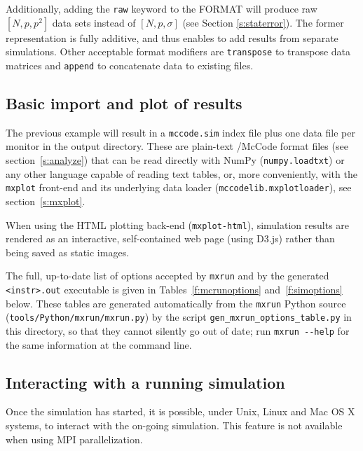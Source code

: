 Additionally, adding the \texttt{raw} keyword to the FORMAT will produce raw
$[N, p, p^2]$ data sets instead of $[N, p, \sigma]$ (see Section
\ref{s:staterror}). The former representation is fully additive, and thus
enables to add results from separate simulations. Other acceptable format
modifiers are \verb+transpose+ to transpose data matrices and \verb+append+ to
concatenate data to existing files.

\subsection{Basic import and plot of results}
\label{s:run-format}
The previous example will result in a \verb+mccode.sim+ index file plus one
data file per monitor in the output directory. These are plain-text
\MCX/McCode format files (see section~\ref{s:analyze}) that can be read
directly with NumPy (\texttt{numpy.loadtxt}) or any other language capable
of reading text tables, or, more conveniently, with the \verb+mxplot+
front-end and its underlying data loader
(\texttt{mccodelib.mxplotloader}), see section~\ref{s:mxplot}.

When using the HTML plotting back-end (\texttt{mxplot-html}), simulation
results are rendered as an interactive, self-contained web page (using D3.js)
rather than being saved as static images.

The full, up-to-date list of options accepted by \texttt{mxrun} and by the
generated \texttt{<instr>.out} executable is given in
Tables~\ref{f:mcrunoptions} and~\ref{f:simoptions} below. These tables are
generated automatically from the \texttt{mxrun} Python source
(\texttt{tools/Python/mxrun/mxrun.py}) by the script
\texttt{gen\_mxrun\_options\_table.py} in this directory, so that they cannot
silently go out of date; run \verb+mxrun --help+ for the same information
at the command line.



\subsection{Interacting with a running simulation}

Once the simulation has started, it is possible, under Unix, Linux and Mac OS X systems, to interact with the on-going simulation. This feature is not available when using MPI parallelization.

